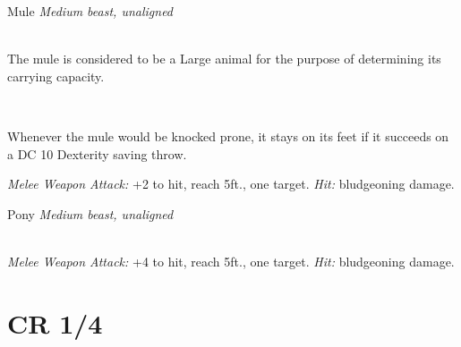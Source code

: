 \documentclass[10pt,twoside,twocolumn,openany]{book}
\begin{document}
\begin{monsterboxnobg}{Mule}
	\textit{Medium beast, unaligned}\\
	\hline
	\basics[
		armorclass	= 10,
		hitpoints 		= \dice{2d8 + 2},
		speed		= {40 ft.}
	]
	\hline
	\stats[
		STR	= \stat{14},
		DEX	= \stat{10},
		CON	= \stat{13},
		INT	= \stat{2},
		WIS	= \stat{10},
		CHA	= \stat{5}
	]
	\hline
	\details[
		skills			= {},
		senses		= {passive Perception 10},
		languages		= {-},
		challenge		= 1/8
	]
	\hline \\[1mm]
	\begin{monsteraction}
		The mule is considered to be a Large animal for the purpose of determining its carrying capacity.
	\end{monsteraction}\\
	\begin{monsteraction}
		Whenever the mule would be knocked prone, it stays on its feet if it succeeds on a DC 10 Dexterity saving throw.
	\end{monsteraction}
	\begin{monsteraction}[Hooves]
		\textit{Melee Weapon Attack:} +2 to hit, reach 5ft., one target. \textit{Hit:}  bludgeoning damage.
	\end{monsteraction}
\end{monsterboxnobg}

\begin{monsterboxnobg}{Pony}
	\textit{Medium beast, unaligned}\\
	\hline
	\basics[
		armorclass	= 10,
		hitpoints 		= \dice{2d8 + 2},
		speed		= {40 ft.}
	]
	\hline
	\stats[
		STR	= \stat{15},
		DEX	= \stat{10},
		CON	= \stat{13},
		INT	= \stat{2},
		WIS	= \stat{11},
		CHA	= \stat{7}
	]
	\hline
	\details[
		skills			= {},
		senses		= {passive Perception 10},
		languages		= {-},
		challenge		= 1/8
	]
	\hline \\[1mm]
	\begin{monsteraction}[Hooves]
		\textit{Melee Weapon Attack:} +4 to hit, reach 5ft., one target. \textit{Hit:}  bludgeoning damage.
	\end{monsteraction}
\end{monsterboxnobg}
\clearpage
\section{CR 1/4}
\end{document}
